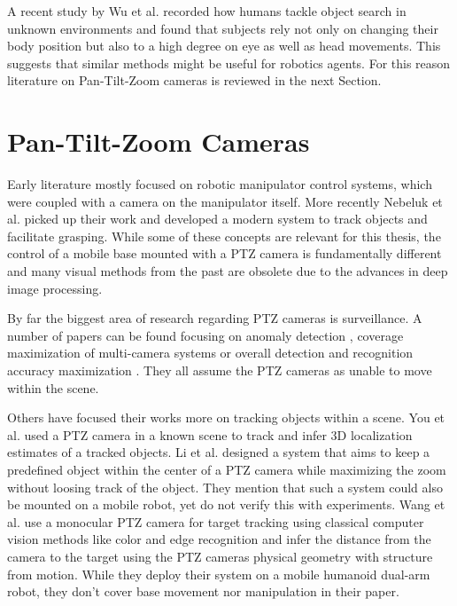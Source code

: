 \documentclass[
	parspace, %
	noindent, %
	final, %
]{elteikthesis}
\begin{document}
A recent study by Wu et al. \cite{realworld_wu_2025} recorded how humans tackle object search in unknown environments and found that subjects rely not only on changing their body position but also to a high degree on eye as well as head movements. This suggests that similar methods might be useful for robotics agents. For this reason literature on Pan-Tilt-Zoom cameras is reviewed in the next Section.

\section{Pan-Tilt-Zoom Cameras}
\label{sec:lit-review-ptz}

Early literature \cite{tutorial_hutchinson_1996, visual_chaumette_2006, visual_chaumette_2007} mostly focused on robotic manipulator control systems, which were coupled with a camera on the manipulator itself. More recently Nebeluk et al. \cite{predictive_nebeluk_2023} picked up their work and developed a modern system to track objects and facilitate grasping. While some of these concepts are relevant for this thesis, the control of a mobile base mounted with a PTZ camera is fundamentally different and many visual methods from the past are obsolete due to the advances in deep image processing.

By far the biggest area of research regarding PTZ cameras is surveillance. A number of papers can be found focusing on anomaly detection \cite{anomalous_lpezrubio_2021}, coverage maximization of multi-camera systems \cite{voronoibased_arslan_2018} or overall detection and recognition accuracy maximization \cite{collaborative_krahnstoever_2008, autonomous_davani_2021}. They all assume the PTZ cameras as unable to move within the scene.

Others have focused their works more on tracking objects within a scene. You et al. \cite{cellbased_you_2022} used a PTZ camera in a known scene to track and infer 3D localization estimates of a tracked objects. Li et al. \cite{camera_li_2021} designed a system that aims to keep a predefined object within the center of a PTZ camera while maximizing the zoom without loosing track of the object. They mention that such a system could also be mounted on a mobile robot, yet do not verify this with experiments. Wang et al. \cite{target_wang_2019} use a monocular PTZ camera for target tracking using classical computer vision methods like color and edge recognition and infer the distance from the camera to the target using the PTZ cameras physical geometry with structure from motion. While they deploy their system on a mobile humanoid dual-arm robot, they don't cover base movement nor manipulation in their paper.
\end{document}
